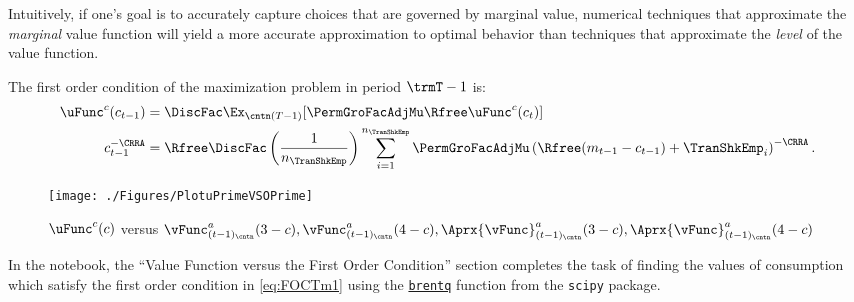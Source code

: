 Intuitively, if one's goal is to accurately capture choices
that are governed by marginal value,
numerical techniques that approximate the \textit{marginal} value
function will yield a more accurate approximation to
optimal behavior than techniques that approximate the \textit{level}
of the value function.

The first order condition of the maximization problem in period $\trmT-1$ is:
  \begin{equation}\begin{gathered}\begin{aligned}
        \uFunc^{{c}}({c}_{\prdT-1})       & = \DiscFac \Ex_{\cntn(T-1)} [\PermGroFacAdjMu\Rfree \uFunc^{{c}}({c}_{\prdT})]  %
        \\      {c}_{\prdT-1}^{-\CRRA}   & = \Rfree \DiscFac \left(\frac{1}{n_{\TranShkEmp}}\right) \sum_{i=1}^{n_{\TranShkEmp}} \PermGroFacAdjMu\left(\Rfree ({m}_{\prdT-1}-{c}_{\prdT-1}) + \TranShkEmp_{i}\right)^{-\CRRA} \label{eq:FOCTm1}.
      \end{aligned}\end{gathered}\end{equation}
\hypertarget{PlotuPrimeVSOPrime}{}
\begin{figure}
  \centerline{\texttt{[image: ./Figures/PlotuPrimeVSOPrime]}}
  \caption{$\uFunc^{{c}}(c)$ versus $\vFunc_{({\prdT-1})_\cntn}^{{a}}(3-c), \vFunc_{({\prdT-1})_\cntn}^{{a}}(4-c), \Aprx{\vFunc}_{({\prdT-1})_\cntn}^{{a}}(3-c), \Aprx{\vFunc}_{({\prdT-1})_\cntn}^{{a}}(4-c)$}
  \label{fig:PlotuPrimeVSOPrime}
\end{figure}

In the notebook, the ``Value Function versus the First Order Condition'' section completes the task of finding the values of consumption which satisfy the first order condition in \eqref{eq:FOCTm1} using the \href{https://docs.scipy.org/doc/scipy/reference/generated/scipy.optimize.brentq.html}{\texttt{brentq}} function from the \texttt{scipy} package. %

